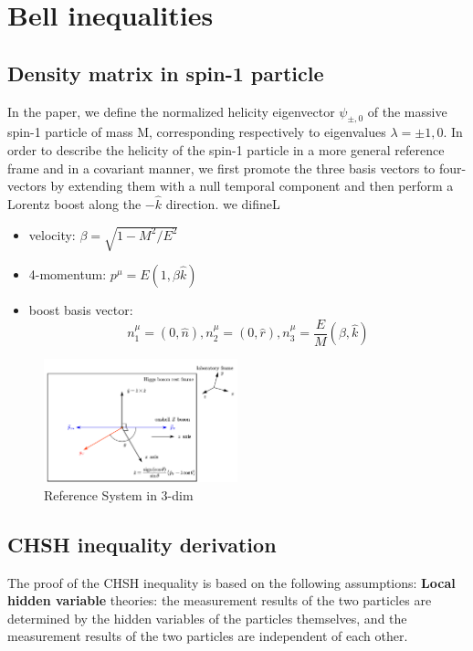 \documentclass{article}
\begin{document}
\section{Bell inequalities}
\subsection{Density matrix in spin-1 particle}
In the paper\cite{fabbrichesi_bell_2023}, we define the normalized helicity eigenvector \(\psi_{\pm,0}\) of the massive spin-1 particle of mass M, corresponding respectively to eigenvalues \(\lambda=\pm1,0\). In order to describe the helicity of the spin-1 particle in a more general reference frame and in a covariant manner, we first promote the three basis vectors to four-vectors by extending them with a null temporal component and then perform a Lorentz boost along the \(-\hat{k}\) direction. we difineL
\begin{itemize}
    \item velocity: \(\beta=\sqrt{1-M^2/E^2}\)
    \item 4-momentum: \(p^\mu=E(1,\beta \hat{k})\)
    \item boost basis vector:
        \[n_1^\mu=(0,\hat{n}),n_2^\mu=(0,\hat{r}), n_3^\mu=\frac{E}{M}(\beta,\hat{k})\]
\end{itemize}
\begin{figure}[htb]
    \centering
    \includegraphics[width=0.5\textwidth]{figure/referenceSystem.pdf}%
    \caption{Reference System in 3-dim }%
    \label{fig:ref3d}
\end{figure}

\subsection{CHSH inequality derivation}

The proof\cite{clauser1974experimental} of the CHSH inequality is based on the following assumptions: \textbf{Local hidden variable} theories: the measurement results of the two particles are determined by the hidden variables of the particles themselves, and the measurement results of the two particles are independent of each other.
\end{document}
